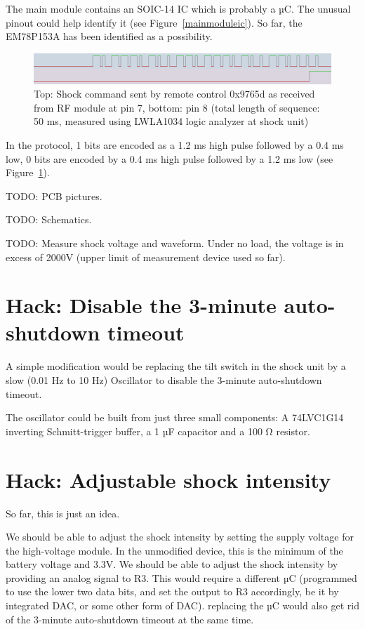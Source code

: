 \documentclass[a4paper]{article}
\begin{document}
The main module contains an SOIC-14 IC which is probably a µC. The unusual pinout could help identify it (see Figure~\ref{mainmoduleic}). So far, the EM78P153A has been identified as a possibility.

\begin{figure}
	\centerline{\includegraphics[scale=0.5]{shockcommand.png}}
	\caption{\label{shockcommand}Top: Shock command sent by remote control 0x9765d as received from RF module at pin 7, bottom: pin 8 (total length of sequence: 50 ms, measured using LWLA1034 logic analyzer at shock unit)}
\end{figure}

In the protocol, 1 bits are encoded as a 1.2 ms high pulse followed by a 0.4 ms low, 0 bits are encoded by a 0.4 ms high pulse followed by a 1.2 ms low (see Figure~\ref{shockcommand}).

TODO: PCB pictures.

TODO: Schematics.

TODO: Measure shock voltage and waveform. Under no load, the voltage is in excess of 2000V (upper limit of measurement device used so far).

\section{Hack: Disable the 3-minute auto-shutdown timeout}

A simple modification would be replacing the tilt switch in the shock unit by a slow (0.01 Hz to 10 Hz) Oscillator to disable the 3-minute auto-shutdown timeout.

The oscillator could be built from just three small components: A 74LVC1G14 inverting Schmitt-trigger buffer, a 1 µF capacitor and a 100 \si{\ohm} resistor.

\section{Hack: Adjustable shock intensity}

So far, this is just an idea.

We should be able to adjust the shock intensity by setting the supply voltage for the high-voltage module. In the unmodified device, this is the minimum of the battery voltage and 3.3V. We should be able to adjust the shock intensity by providing an analog signal to R3. This would require a different µC (programmed to use the lower two data bits, and set the output to R3 accordingly, be it by integrated DAC, or some other form of DAC). replacing the µC would also get rid of the 3-minute auto-shutdown timeout at the same time.
\end{document}
